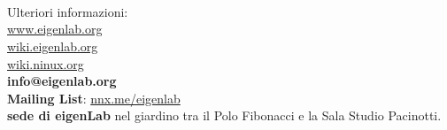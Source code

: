 \documentclass{beamer}
\begin{document}
\section{}
\begin{frame}

\begin{columns}

\\
\vspace{5pt}
Ulteriori informazioni:\\
\url{www.eigenlab.org}\\
\url{wiki.eigenlab.org}\\
\url{wiki.ninux.org}\\
\textbf{info@eigenlab.org}\\
\textbf{Mailing List}: \url{nnx.me/eigenlab}\\
\textbf{sede di eigenLab} nel giardino tra il Polo Fibonacci e la Sala Studio Pacinotti.


\end{columns}
\end{frame}
\end{document}
